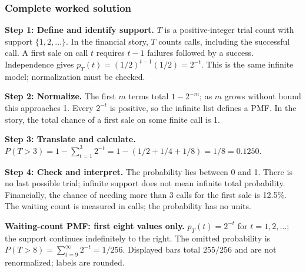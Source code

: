 \subsubsection*{Complete worked solution}
\par\noindent\begin{minipage}{\linewidth}
\textbf{Step 1: Define and identify support.} $T$ is a positive-integer trial count with support $\{1,2,\ldots\}$. In the financial story, $T$ counts calls, including the successful call. A first sale on call $t$ requires $t-1$ failures followed by a success. Independence gives $p_T(t)=(1/2)^{t-1}(1/2)=2^{-t}$. This is the same infinite model; normalization must be checked.
\end{minipage}\par\medskip
\par\noindent\begin{minipage}{\linewidth}
\textbf{Step 2: Normalize.} The first $m$ terms total $1-2^{-m}$; as $m$ grows without bound this approaches 1. Every $2^{-t}$ is positive, so the infinite list defines a PMF. In the story, the total chance of a first sale on some finite call is 1.
\end{minipage}\par\medskip
\par\noindent\begin{minipage}{\linewidth}
\textbf{Step 3: Translate and calculate.} $P(T>3)=1-\sum_{t=1}^{3}2^{-t}=1-(1/2+1/4+1/8)=1/8=0.1250$.
\end{minipage}\par\medskip
\par\noindent\begin{minipage}{\linewidth}
\textbf{Step 4: Check and interpret.} The probability lies between 0 and 1. There is no last possible trial; infinite support does not mean infinite total probability. Financially, the chance of needing more than 3 calls for the first sale is 12.5\%. The waiting count is measured in calls; the probability has no units.
\end{minipage}\par\medskip
\par\noindent \begin{minipage}[t]{.98\linewidth}
\centering
{}
\par\small \textbf{Waiting-count PMF: first eight values only.} $p_T(t)=2^{-t}$ for $t=1,2,\ldots$; the support continues indefinitely to the right. The omitted probability is $P(T>8)=\sum_{t=9}^{\infty}2^{-t}=1/256$. Displayed bars total $255/256$ and are not renormalized; labels are rounded.
\end{minipage}\par\medskip

